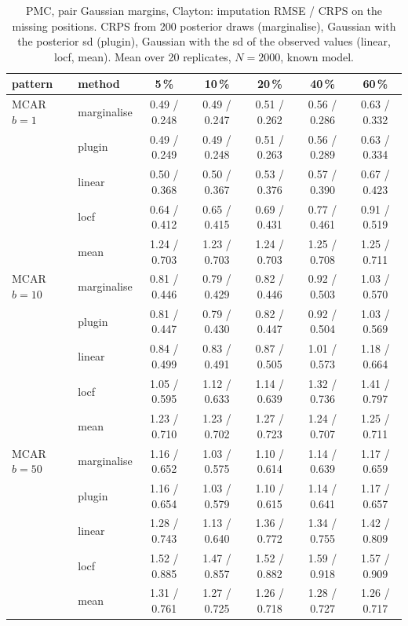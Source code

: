 \begin{table}[htbp]
  \centering
  \small
  \setlength{\tabcolsep}{4pt}
  \caption{PMC, pair Gaussian margins, Clayton: imputation RMSE / CRPS on the missing positions. CRPS from 200 posterior draws (marginalise), Gaussian with the posterior sd (plugin), Gaussian with the sd of the observed values (linear, locf, mean). Mean over 20 replicates, $N = 2000$, known model.}
  \label{tab:missing-imp-pmc_pair_gauss_k2}
  \begin{tabular}{llccccc}
    \toprule
    pattern & method & 5\,\% & 10\,\% & 20\,\% & 40\,\% & 60\,\% \\
    \midrule
    MCAR $b{=}1$ & marginalise & 0.49 / 0.248 & 0.49 / 0.247 & 0.51 / 0.262 & 0.56 / 0.286 & 0.63 / 0.332 \\
     & plugin & 0.49 / 0.249 & 0.49 / 0.248 & 0.51 / 0.263 & 0.56 / 0.289 & 0.63 / 0.334 \\
     & linear & 0.50 / 0.368 & 0.50 / 0.367 & 0.53 / 0.376 & 0.57 / 0.390 & 0.67 / 0.423 \\
     & locf & 0.64 / 0.412 & 0.65 / 0.415 & 0.69 / 0.431 & 0.77 / 0.461 & 0.91 / 0.519 \\
     & mean & 1.24 / 0.703 & 1.23 / 0.703 & 1.24 / 0.703 & 1.25 / 0.708 & 1.25 / 0.711 \\
    \addlinespace
    MCAR $b{=}10$ & marginalise & 0.81 / 0.446 & 0.79 / 0.429 & 0.82 / 0.446 & 0.92 / 0.503 & 1.03 / 0.570 \\
     & plugin & 0.81 / 0.447 & 0.79 / 0.430 & 0.82 / 0.447 & 0.92 / 0.504 & 1.03 / 0.569 \\
     & linear & 0.84 / 0.499 & 0.83 / 0.491 & 0.87 / 0.505 & 1.01 / 0.573 & 1.18 / 0.664 \\
     & locf & 1.05 / 0.595 & 1.12 / 0.633 & 1.14 / 0.639 & 1.32 / 0.736 & 1.41 / 0.797 \\
     & mean & 1.23 / 0.710 & 1.23 / 0.702 & 1.27 / 0.723 & 1.24 / 0.707 & 1.25 / 0.711 \\
    \addlinespace
    MCAR $b{=}50$ & marginalise & 1.16 / 0.652 & 1.03 / 0.575 & 1.10 / 0.614 & 1.14 / 0.639 & 1.17 / 0.659 \\
     & plugin & 1.16 / 0.654 & 1.03 / 0.579 & 1.10 / 0.615 & 1.14 / 0.641 & 1.17 / 0.657 \\
     & linear & 1.28 / 0.743 & 1.13 / 0.640 & 1.36 / 0.772 & 1.34 / 0.755 & 1.42 / 0.809 \\
     & locf & 1.52 / 0.885 & 1.47 / 0.857 & 1.52 / 0.882 & 1.59 / 0.918 & 1.57 / 0.909 \\
     & mean & 1.31 / 0.761 & 1.27 / 0.725 & 1.26 / 0.718 & 1.28 / 0.727 & 1.26 / 0.717 \\

\end{tabular}
\end{table}
